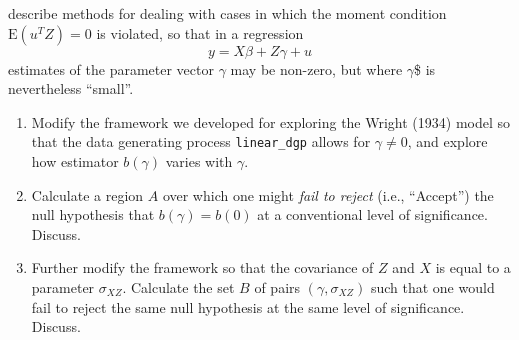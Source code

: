 \documentclass[12pt]{amsart}
\begin{document}
\textcite{conley-etal12} describe methods for dealing with cases in which
the moment condition \(\mbox{E}(u^T Z)=0\) is violated, so that in a regression
\begin{equation}
   y = X\beta + Z\gamma + u
\end{equation}
estimates of the parameter vector \(\gamma\) may be non-zero, but where
\(\gamma\)\$ is nevertheless ``small''.

\begin{enumerate}
\item Modify the framework we developed for exploring the  Wright (1934)
model so that the data generating process \texttt{linear\_dgp} allows for \(\gamma\neq
   0\), and explore how estimator \(b(\gamma)\) varies with
\(\gamma\).

\item Calculate a region \(A\) over which one might \emph{fail to reject} (i.e.,
``Accept'') the null hypothesis that \(b(\gamma)=b(0)\) at a
conventional level of significance.  Discuss.

\item Further modify the framework so that the covariance of \(Z\) and
\(X\) is equal to a parameter \(\sigma_{XZ}\).  Calculate the set
\(B\) of pairs \((\gamma,\sigma_{XZ})\) such that one would fail to
reject the same null hypothesis at the same level of significance.
Discuss.
\end{enumerate}
\end{document}
